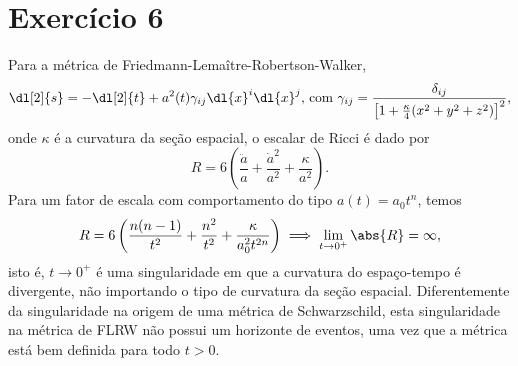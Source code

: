 \section*{Exercício 6}
Para a métrica de Friedmann-Lemaître-Robertson-Walker,
\begin{equation*}
    \dl[2]{s} = -\dl[2]{t} + a^2(t) \gamma_{ij} \dl{x}^i\dl{x}^j\text{, com }\gamma_{ij} = \frac{\delta_{ij}}{\left[1 + \frac{\kappa}4(x^2 + y^2 + z^2)\right]^2},
\end{equation*}
onde \(\kappa\) é a curvatura da seção espacial, o escalar de Ricci é dado por
\begin{equation*}
    R = 6\left(\frac{\ddot{a}}{a} + \frac{\dot{a}^2}{a^2} + \frac{\kappa}{a^2}\right).
\end{equation*}
Para um fator de escala com comportamento do tipo \(a(t) = a_0t^n\), temos
\begin{equation*}
    R = 6 \left(\frac{n(n-1)}{t^2} + \frac{n^2}{t^2} + \frac{\kappa}{a_0^2t^{2n}}\right) \implies \lim_{t \to 0^+} \abs{R} = \infty,
\end{equation*}
isto é, \(t \to 0^+\) é uma singularidade em que a curvatura do espaço-tempo é divergente, não importando o tipo de curvatura da seção espacial. Diferentemente da singularidade na origem de uma métrica de Schwarzschild, esta singularidade na métrica de FLRW não possui um horizonte de eventos, uma vez que a métrica está bem definida para todo \(t > 0\).

